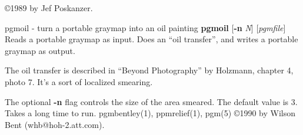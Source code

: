 \copyright 1989 by Jef Poskanzer.
%
 
%

\newpage
%

pgmoil - turn a portable graymap into an oil painting
{\bf pgmoil}
{\rm [}{\bf -n}
{\it N}{\rm ]}
{\rm [}{\it pgmfile}{\rm ]}
Reads a portable graymap as input.
Does an ``oil transfer'', and writes a portable graymap as output.
\par
The oil transfer is described in ``Beyond Photography'' by Holzmann,
chapter 4, photo 7.
It's a sort of localized smearing.
\par
The optional
{\bf -n}
flag controls the size of the area smeared.  The default value is 3.
Takes a long time to run.
pgmbentley(1), ppmrelief(1), pgm(5)
\copyright 1990 by Wilson Bent (whb@hoh-2.att.com).
%
 
%

